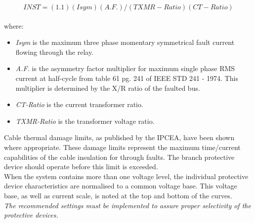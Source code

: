 \[INST = (1.1)(Isym)(A.F.)/(TXMR - Ratio)(CT - Ratio)\]\\

\noindent where:
\begin{itemize}
	\item \emph{Isym} is the maximum three phase momentary symmetrical fault current flowing
through the relay.
	\item \emph{A.F.} is the asymmetry factor multiplier for maximum single phase RMS
current at half-cycle from table 61 pg. 241 of IEEE STD 241 - 1974. This
multiplier is determined by the X/R ratio of the faulted bus.
	\item \emph{CT-Ratio} is the current transformer ratio.
	\item \emph{TXMR-Ratio} is the transformer voltage ratio.
\end{itemize}

Cable thermal damage limits, as published by the IPCEA, have been shown where
appropriate. These damage limits represent the maximum time/current capabilities of
the cable insulation for through faults. The branch protective device should operate
before this limit is exceeded.\\

When the system contains more than one voltage level, the individual protective device
characteristics are normalised to a common voltage base. This voltage base, as well
as current scale, is noted at the top and bottom of the curves.\\

\emph{The recommended settings must be implemented to assure proper selectivity of
the protective devices.}
